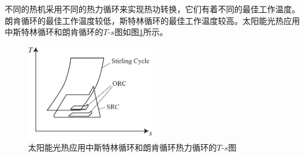 不同的热机采用不同的热力循环来实现热功转换，它们有着不同的最佳工作温度。朗肯循环的最佳工作温度较低，斯特林循环的最佳工作温度较高。太阳能光热应用中斯特林循环和朗肯循环的$T$-$s$图如图\ref{fig:cycles}所示。
\begin{figure}[htb]
\centering 
\includegraphics[width=0.5\textwidth]{fig/cycles}
\caption{太阳能光热应用中斯特林循环和朗肯循环热力循环的$T$-$s$图}\label{fig:cycles}
\end{figure}

